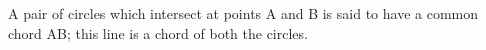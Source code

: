  A pair of circles which intersect at points A and B is
said to have a common chord AB; this line is a chord of both
the circles.
